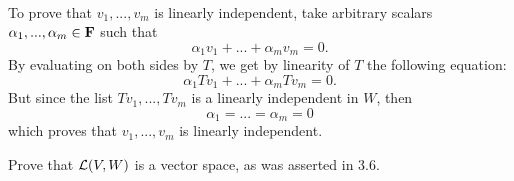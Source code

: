 \begin{solution}
    \\ To prove that $v_1, ..., v_m$ is linearly independent, take arbitrary scalars $\alpha_1, ..., \alpha_m \in \mathbf{F}$ such that
    $$\alpha_1 v_1 + ... + \alpha_m v_m = 0.$$
    By evaluating on both sides by $T$, we get by linearity of $T$ the following equation:
    $$\alpha_1 Tv_1 + ... + \alpha_m Tv_m = 0.$$
    But since the list $Tv_1, ..., Tv_m$ is a linearly independent in $W$, then 
    $$\alpha_1 = ... = \alpha_m = 0$$
    which proves that $v_1, ..., v_m$ is linearly independent. \\
\end{solution}

\begin{exercise}
    Prove that $\mathcal{L}(V, W)$ is a vector space, as was asserted in 3.6. \\
\end{exercise}

